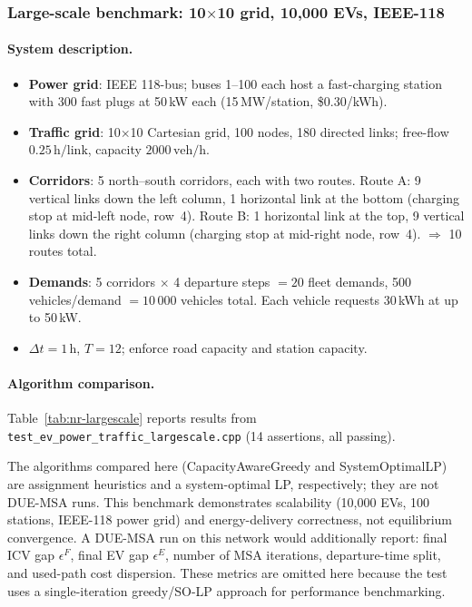 \subsubsection{Large-scale benchmark: 10$\times$10 grid, 10,000 EVs, IEEE-118}
\label{sec:traffic-nr-largescale}

\paragraph{System description.}
\begin{itemize}
  \item \textbf{Power grid}: IEEE 118-bus; buses 1--100 each host a
        fast-charging station with 300 fast plugs at 50\,kW each
        (15\,MW/station, \$0.30/kWh).
  \item \textbf{Traffic grid}: 10$\times$10 Cartesian grid, 100 nodes,
        180 directed links; free-flow $0.25\,\text{h/link}$,
        capacity $2000\,\text{veh/h}$.
  \item \textbf{Corridors}: 5 north--south corridors, each with two routes.
        Route A: 9 vertical links down the left column, 1 horizontal link
        at the bottom (charging stop at mid-left node, row~4).
        Route B: 1 horizontal link at the top, 9 vertical links down the
        right column (charging stop at mid-right node, row~4).
        $\Rightarrow$ 10 routes total.
  \item \textbf{Demands}: 5 corridors $\times$ 4 departure steps $= 20$
        fleet demands, 500 vehicles/demand $= 10\,000$ vehicles total.
        Each vehicle requests 30\,kWh at up to 50\,kW.
  \item $\Delta t = 1\,\text{h}$, $T = 12$;
        enforce road capacity and station capacity.
\end{itemize}

\paragraph{Algorithm comparison.}
Table~\ref{tab:nr-largescale} reports results from
\texttt{test\_ev\_power\_traffic\_largescale.cpp} (14 assertions, all passing).

\begin{remark}
  The algorithms compared here (CapacityAwareGreedy and SystemOptimalLP)
  are assignment heuristics and a system-optimal LP, respectively; they
  are not DUE-MSA runs.  This benchmark demonstrates scalability
  (10,000 EVs, 100 stations, IEEE-118 power grid) and
  energy-delivery correctness, not equilibrium convergence.
  A DUE-MSA run on this network would additionally report:
  final ICV gap $\epsilon^F$, final EV gap $\epsilon^E$, number of MSA
  iterations, departure-time split, and used-path cost dispersion.
  These metrics are omitted here because the test uses a single-iteration
  greedy/SO-LP approach for performance benchmarking.
\end{remark}

